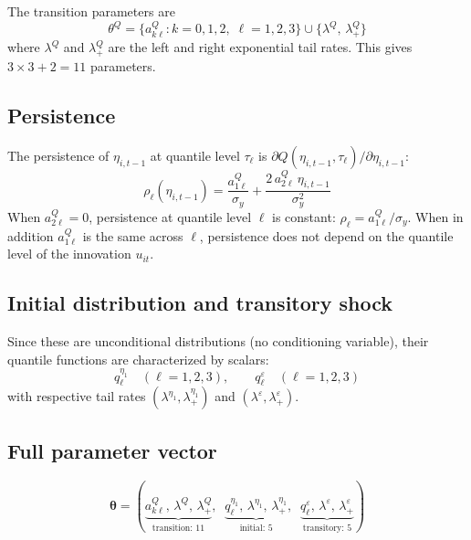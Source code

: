 \documentclass[12pt]{article}
\newcommand{\btheta}{\bm{\theta}}
\begin{document}
The transition parameters are
\begin{equation}
\theta^Q = \{a_{k\ell}^Q : k=0,1,2,\; \ell=1,2,3\} \cup \{\lambda^Q,\, \lambda_+^Q\}
\end{equation}
where $\lambda^Q$ and $\lambda_+^Q$ are the left and right exponential tail rates.  This gives $3 \times 3 + 2 = 11$ parameters.

\subsection{Persistence}

The persistence of $\eta_{i,t-1}$ at quantile level $\tau_\ell$ is
$\partial Q(\eta_{i,t-1}, \tau_\ell) / \partial \eta_{i,t-1}$:
\begin{equation}
\rho_\ell(\eta_{i,t-1}) = \frac{a_{1\ell}^Q}{\sigma_y} + \frac{2\, a_{2\ell}^Q\, \eta_{i,t-1}}{\sigma_y^2}
\end{equation}
When $a_{2\ell}^Q = 0$, persistence at quantile level $\ell$ is constant: $\rho_\ell = a_{1\ell}^Q / \sigma_y$.  When in addition $a_{1\ell}^Q$ is the same across $\ell$, persistence does not depend on the quantile level of the innovation $u_{it}$.

\subsection{Initial distribution and transitory shock}

Since these are unconditional distributions (no conditioning variable), their quantile functions are characterized by scalars:
\begin{equation}
q_\ell^{\eta_1} \quad (\ell=1,2,3), \qquad q_\ell^{\varepsilon} \quad (\ell=1,2,3)
\end{equation}
with respective tail rates $(\lambda^{\eta_1}, \lambda_+^{\eta_1})$ and $(\lambda^\varepsilon, \lambda_+^\varepsilon)$.

\subsection{Full parameter vector}

\begin{equation}
\btheta = (\underbrace{a_{k\ell}^Q,\, \lambda^Q,\, \lambda_+^Q}_{\text{transition: 11}},\;\; \underbrace{q_\ell^{\eta_1},\, \lambda^{\eta_1},\, \lambda_+^{\eta_1}}_{\text{initial: 5}},\;\; \underbrace{q_\ell^{\varepsilon},\, \lambda^\varepsilon,\, \lambda_+^\varepsilon}_{\text{transitory: 5}})
\end{equation}
\end{document}
